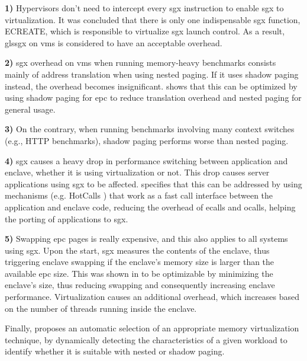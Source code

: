 \textbf{1)} Hypervisors don't need to intercept every \gls{sgx} instruction to enable \gls{sgx} to virtualization. It was concluded that there is only one indispensable \gls{sgx} function, ECREATE, which is responsible to virtualize \gls{sgx} launch control. As a result, gls{sgx} on \gls{vm}s is considered to have an acceptable overhead.

\textbf{2)} \gls{sgx} overhead on \gls{vm}s when running memory-heavy benchmarks consists mainly of address translation when using nested paging. If it uses shadow paging instead, the overhead becomes insignificant. 
\cite{sgxVirtualizationPaper} shows that this can be optimized by using shadow paging for \gls{epc} to reduce translation overhead and nested paging for general usage.

\textbf{3)} On the contrary, when running benchmarks involving many context switches (e.g., HTTP benchmarks), shadow paging performs worse than nested paging.

\textbf{4)} \gls{sgx} causes a heavy drop in performance switching between application and enclave, whether it is using virtualization or not. This drop causes server applications using \gls{sgx} to be affected.
\cite{sgxVirtualizationPaper} specifies that this can be addressed by using mechanisms (e.g. HotCalls \cite{hotcallsPaper}) that work as a fast call interface between the application and enclave code, reducing the overhead of ecalls and ocalls, helping the porting of applications to \gls{sgx}.

\textbf{5)} Swapping \gls{epc} pages is really expensive, and this also applies to all systems using \gls{sgx}. 
Upon the start, \gls{sgx} measures the contents of the enclave, thus triggering enclave swapping if the enclave's memory size is larger than the available \gls{epc} size. 
This was shown in \cite{sgxVirtualizationPaper} to be optimizable by minimizing the enclave's size, thus reducing swapping and consequently increasing enclave performance.
Virtualization causes an additional overhead, which increases based on the number of threads running inside the enclave.

Finally, \cite{sgxVirtualizationPaper} proposes an automatic selection of an appropriate memory virtualization technique, by dynamically detecting the characteristics of a given workload to identify whether it is suitable with nested or shadow paging.\newline


